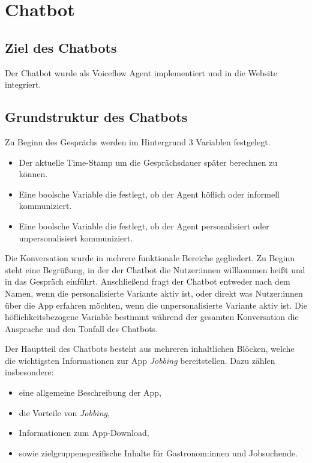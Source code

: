 \section{Chatbot}

\subsection{Ziel des Chatbots}

Der Chatbot wurde als Voiceflow Agent implementiert und in die Website integriert.

\subsection{Grundstruktur des Chatbots}

Zu Beginn des Gesprächs werden im Hintergrund 3 Variablen festgelegt.
\begin{itemize}
    \item Der aktuelle Time-Stamp um die Gesprächsdauer später berechnen zu können.
    \item Eine boolsche Variable die festlegt, ob der Agent höflich oder informell kommuniziert.
    \item Eine boolsche Variable die festlegt, ob der Agent personalisiert oder unpersonalisiert kommuniziert.
\end{itemize} 

Die Konversation wurde in mehrere funktionale Bereiche gegliedert. Zu
Beginn steht eine Begrüßung, in der der Chatbot die Nutzer:innen
willkommen heißt und in das Gespräch einführt. Anschließend fragt der Chatbot
entweder nach dem Namen, wenn die personalisierte Variante aktiv ist, oder direkt
was Nutzer:innen über die App erfahren möchten, wenn die unpersonalisierte Variante aktiv ist.
Die höflichkeitsbezogene Variable bestimmt während der gesamten Konversation
die Ansprache und den Tonfall des Chatbots. 

Der Hauptteil des Chatbots besteht aus mehreren inhaltlichen Blöcken,
welche die wichtigsten Informationen zur App \textit{Jobbing}
bereitstellen. Dazu zählen insbesondere:
\begin{itemize}
    \item eine allgemeine Beschreibung der App,
    \item die Vorteile von \textit{Jobbing},
    \item Informationen zum App-Download,
    \item sowie zielgruppenspezifische Inhalte für Gastronom:innen und
    Jobsuchende.
\end{itemize}

